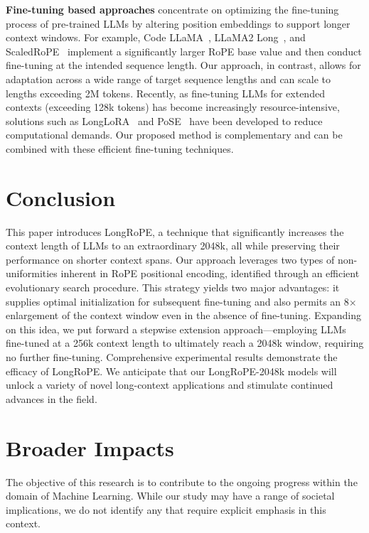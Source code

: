 \textbf{Fine-tuning based approaches} concentrate on optimizing the fine-tuning process of pre-trained LLMs by altering position embeddings to support longer context windows. For example, Code LLaMA~\cite{codellama}, LLaMA2 Long~\cite{xiong2023effective}, and ScaledRoPE~\cite{liu2023scaling} implement a significantly larger RoPE base value and then conduct fine-tuning at the intended sequence length. Our approach, in contrast, allows for adaptation across a wide range of target sequence lengths and can scale to lengths exceeding 2M tokens. Recently, as fine-tuning LLMs for extended contexts (exceeding 128k tokens) has become increasingly resource-intensive, solutions such as LongLoRA~\cite{longlora} and PoSE~\cite{zhu2023pose} have been developed to reduce computational demands. Our proposed method is complementary and can be combined with these efficient fine-tuning techniques.

\section{Conclusion}

This paper introduces LongRoPE, a technique that significantly increases the context length of LLMs to an extraordinary 2048k, all while preserving their performance on shorter context spans. Our approach leverages two types of non-uniformities inherent in RoPE positional encoding, identified through an efficient evolutionary search procedure. This strategy yields two major advantages: it supplies optimal initialization for subsequent fine-tuning and also permits an 8$\times$ enlargement of the context window even in the absence of fine-tuning. Expanding on this idea, we put forward a stepwise extension approach—employing LLMs fine-tuned at a 256k context length to ultimately reach a 2048k window, requiring no further fine-tuning. Comprehensive experimental results demonstrate the efficacy of LongRoPE. We anticipate that our LongRoPE-2048k models will unlock a variety of novel long-context applications and stimulate continued advances in the field.

\section*{Broader Impacts} The objective of this research is to contribute to the ongoing progress within the domain of Machine Learning. While our study may have a range of societal implications, we do not identify any that require explicit emphasis in this context.

	\balance

